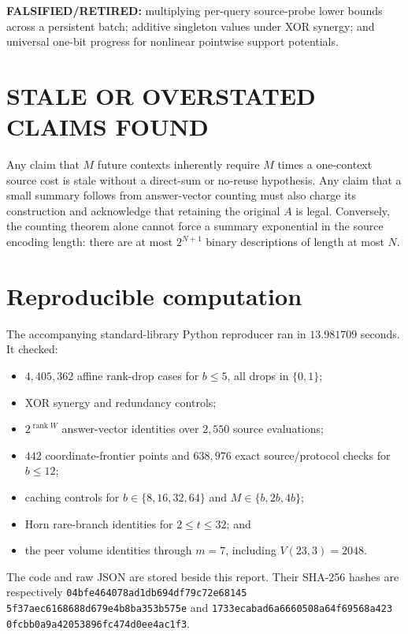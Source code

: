 \documentclass[11pt]{article}
\newcommand{\rank}{\operatorname{rank}}
\begin{document}
\textbf{FALSIFIED/RETIRED:} multiplying per-query source-probe lower bounds across a persistent batch; additive singleton values under XOR synergy; and universal one-bit progress for nonlinear pointwise support potentials.

\section{STALE OR OVERSTATED CLAIMS FOUND}

Any claim that $M$ future contexts inherently require $M$ times a one-context source cost is stale without a direct-sum or no-reuse hypothesis.  Any claim that a small summary follows from answer-vector counting must also charge its construction and acknowledge that retaining the original $A$ is legal.  Conversely, the counting theorem alone cannot force a summary exponential in the source encoding length: there are at most $2^{N+1}$ binary descriptions of length at most $N$.

\section{Reproducible computation}

The accompanying standard-library Python reproducer ran in $13.981709$ seconds.  It checked:
\begin{itemize}[leftmargin=*]
\item $4{,}405{,}362$ affine rank-drop cases for $b\le5$, all drops in $\{0,1\}$;
\item XOR synergy and redundancy controls;
\item $2^{\rank W}$ answer-vector identities over $2{,}550$ source evaluations;
\item $442$ coordinate-frontier points and $638{,}976$ exact source/protocol checks for $b\le12$;
\item caching controls for $b\in\{8,16,32,64\}$ and $M\in\{b,2b,4b\}$;
\item Horn rare-branch identities for $2\le t\le32$; and
\item the peer volume identities through $m=7$, including $V(23,3)=2048$.
\end{itemize}
The code and raw JSON are stored beside this report.  Their SHA-256 hashes are respectively
\texttt{04bfe464078ad1db}\allowbreak\texttt{694df79c72e68145}\allowbreak
\texttt{5f37aec6168688d6}\allowbreak\texttt{79e4b8ba353b575e}
and
\texttt{1733ecabad6a6660}\allowbreak\texttt{508a64f69568a423}\allowbreak
\texttt{0fcbb0a9a4205389}\allowbreak\texttt{6fc474d0ee4ac1f3}.
\end{document}
